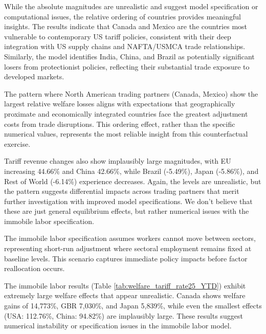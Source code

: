 While the absolute magnitudes are unrealistic and suggest model specification or computational issues, the relative ordering of countries provides meaningful insights. The results indicate that Canada and Mexico are the countries most vulnerable to contemporary US tariff policies, consistent with their deep integration with US supply chains and NAFTA/USMCA trade relationships. Similarly, the model identifies India, China, and Brazil as potentially significant losers from protectionist policies, reflecting their substantial trade exposure to developed markets.

\begin{landscape}
    \vspace*{\fill}
    
    \vspace*{\fill}
\end{landscape}
The pattern where North American trading partners (Canada, Mexico) show the largest relative welfare losses aligns with expectations that geographically proximate and economically integrated countries face the greatest adjustment costs from trade disruptions. This ordering effect, rather than the specific numerical values, represents the most reliable insight from this counterfactual exercise.

Tariff revenue changes also show implausibly large magnitudes, with EU increasing 44.66\% and China 42.66\%, while Brazil (-5.49\%), Japan (-5.86\%), and Rest of World (-6.14\%) experience decreases. Again, the levels are unrealistic, but the pattern suggests differential impacts across trading partners that merit further investigation with improved model specifications. We don't believe that these are just general equilibrium effects, but rather numerical issues with the immobile labor specification.

The immobile labor specification assumes workers cannot move between sectors, representing short-run adjustment where sectoral employment remains fixed at baseline levels. This scenario captures immediate policy impacts before factor reallocation occurs.

The immobile labor results (Table \ref{tab:welfare_tariff_rate25_YTD}) exhibit extremely large welfare effects that appear unrealistic. Canada shows welfare gains of 14,773\%, GBR 7,030\%, and Japan 5,839\%, while even the smallest effects (USA: 112.76\%, China: 94.82\%) are implausibly large. These results suggest numerical instability or specification issues in the immobile labor model.

